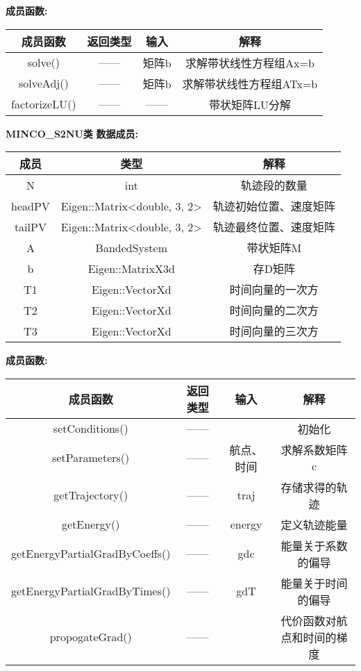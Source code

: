 \begin{tcolorbox}[red]
        \textbf{成员函数:}\\
        \begin{tabular}{cccc}
            \toprule
            成员函数 & 返回类型 & 输入 & 解释  \\
            \midrule
            solve() & —— & 矩阵b & 求解带状线性方程组Ax=b\\
            solveAdj() & —— & 矩阵b & 求解带状线性方程组ATx=b\\
            factorizeLU() & —— & —— & 带状矩阵LU分解\\
            \bottomrule
        \end{tabular}
\end{tcolorbox}
    \textbf{MINCO\_S2NU类}
    \textbf{数据成员:}\\
    \begin{tcolorbox}[red]
    \begin{tabular}{ccc}
        \toprule
        成员 & 类型  & 解释  \\
        \midrule
        N & int & 轨迹段的数量 \\
        headPV & Eigen::Matrix<double, 3, 2> & 轨迹初始位置、速度矩阵 \\
        tailPV & Eigen::Matrix<double, 3, 2> & 轨迹最终位置、速度矩阵 \\
        A & BandedSystem & 带状矩阵M \\
        b & Eigen::MatrixX3d & 存D矩阵 \\
        T1 & Eigen::VectorXd & 时间向量的一次方 \\
        T2 & Eigen::VectorXd & 时间向量的二次方 \\
        T3 & Eigen::VectorXd &时间向量的三次方 \\
        \bottomrule
    \end{tabular}
    \end{tcolorbox}
    \begin{tcolorbox}[red]
        \textbf{成员函数:}\\
        \begin{tabular}{cccc}
            \toprule
            成员函数 & 返回类型 & 输入 & 解释  \\
            \midrule
            setConditions() & —— & ~~~ & 初始化\\
            setParameters() & —— & 航点、时间 & 求解系数矩阵c\\
            getTrajectory() & —— & traj & 存储求得的轨迹\\
            getEnergy() & —— & energy & 定义轨迹能量\\
            getEnergyPartialGradByCoeffs() & —— & gdc & 能量关于系数的偏导\\
            getEnergyPartialGradByTimes() & —— & gdT & 能量关于时间的偏导\\
            propogateGrad()& —— & ~~ & 代价函数对航点和时间的梯度\\
            \bottomrule
        \end{tabular}
    \end{tcolorbox}


